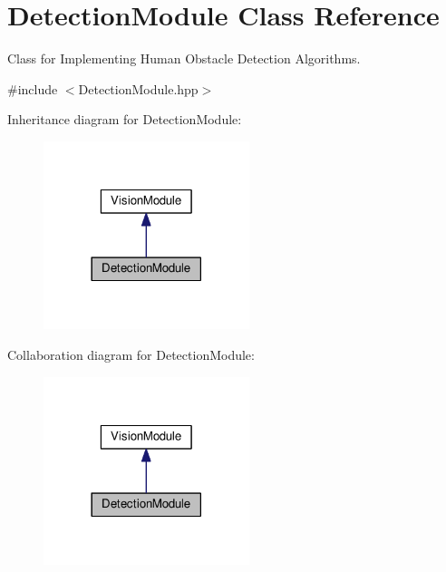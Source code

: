 \hypertarget{classDetectionModule}{}\section{Detection\+Module Class Reference}
\label{classDetectionModule}


Class for Implementing Human Obstacle Detection Algorithms.  




{\ttfamily \#include $<$Detection\+Module.\+hpp$>$}



Inheritance diagram for Detection\+Module\+:\nopagebreak
\begin{figure}[H]
\begin{center}
\leavevmode
\includegraphics[width=170pt]{classDetectionModule__inherit__graph}
\end{center}
\end{figure}


Collaboration diagram for Detection\+Module\+:\nopagebreak
\begin{figure}[H]
\begin{center}
\leavevmode
\includegraphics[width=170pt]{classDetectionModule__coll__graph}
\end{center}
\end{figure}
